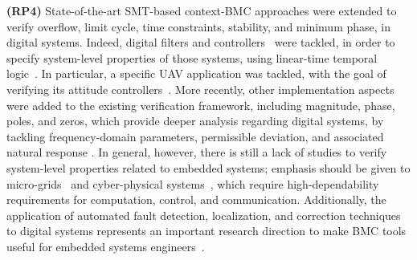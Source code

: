 \documentclass[format=acmsmall, review=false, screen=true]{acmart}
\begin{document}
\textbf{(RP4)} State-of-the-art SMT-based context-BMC approaches were extended to verify overflow, limit cycle, time constraints, stability, and minimum phase, in digital systems. Indeed, digital filters and controllers~\cite{dsv_spin2015,esbmc_controller,esbmc_filter} were tackled, in order to specify system-level properties of those systems, using linear-time temporal logic~\cite{JMorse15}. In particular, a specific UAV application was tackled, with the goal of verifying its attitude controllers~\cite{Bessa16,Chaves17}. More recently, other implementation aspects were added to the existing verification framework, including magnitude, phase, poles, and zeros, which provide deeper analysis regarding digital systems, by tackling frequency-domain parameters, permissible deviation, and associated natural response \cite{sbrtdaniel}. In general, however, there is still a lack of studies to verify system-level properties related to embedded systems; emphasis should be given to micro-grids~\cite{xu15} and cyber-physical systems~\cite{leeCPS2}, which require high-dependability requirements for computation, control, and communication. Additionally, the application of automated fault detection, localization, and correction techniques to digital systems represents an important research direction to make BMC tools useful for embedded systems engineers~\cite{Alves15}.
\end{document}
